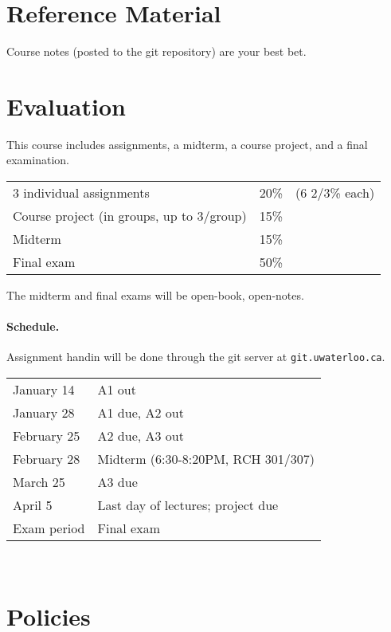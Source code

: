 \documentclass{article}
\begin{document}
\section*{Reference Material}
Course notes (posted to the git repository) are your best bet.

\newpage
\section*{Evaluation}
This course includes assignments, a midterm, a course project, and a final
examination.

\begin{tabular}{lrl}
3 individual assignments & 20\% & (6 2/3\% each) \\
Course project (in groups, up to 3/group) & 15\% \\
Midterm & 15\% \\
Final exam & 50\% \\
\end{tabular}

\noindent The midterm and final exams will be open-book, open-notes. 

\paragraph{Schedule.} Assignment handin will be done through the git server at {\tt git.uwaterloo.ca}.\\[-1em]
\begin{center}
\begin{tabular}{ll}
January 14	&A1 out\\
January 28	&A1 due, A2 out\\
February 25	&A2 due, A3 out\\
February 28     &Midterm (6:30-8:20PM, RCH 301/307)\\
March 25        &A3 due\\
April 5 	&Last day of lectures; project due\\
Exam period	&Final exam
\end{tabular}~\\
\end{center}

\section*{Policies}
\end{document}
